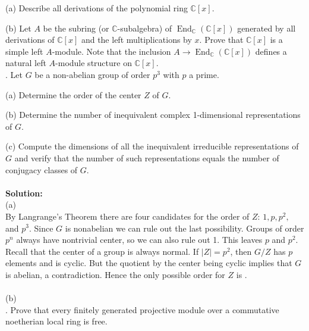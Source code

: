 \documentclass[11pt]{article}
\newcommand{\C}{\mathbb{C}}
\DeclareMathOperator{\End}{End}
\begin{document}
(a) Describe all derivations of the polynomial ring $\C[x]$.

(b) Let $A$ be the subring (or $\C$-subalgebra) of $\End_\C(\C[x])$ generated by all derivations of $\C[x]$ and the left multiplications by $x$. Prove that $\C[x]$ is a simple left $A$-module. Note that the inclusion $A\to \End_\C(\C[x])$ defines a natural left $A$-module structure on $\C[x]$. \\

. Let $G$ be a non-abelian group of order $p^3$ with $p$ a prime.

(a) Determine the order of the center $Z$ of $G$.

(b) Determine the number of inequivalent complex 1-dimensional representations of $G$. 

(c) Compute the dimensions of all the inequivalent irreducible representations of $G$ and verify that the number of such representations equals the number of conjugacy classes of $G$. \\\\
\textbf{Solution:}\\
(a)\\
By Langrange's Theorem there are four candidates for the order of $Z$: $1,p,p^2,$ and $p^3$. Since $G$ is nonabelian we can rule out the last possibility. Groups of order $p^n$ always have nontrivial center, so we can also rule out 1. This leaves $p$ and $p^2$. Recall that the center of a group is always normal. If $|Z| = p^2$, then $G/Z$ has $p$ elements and is cyclic. But the quotient by the center being cyclic implies that $G$ is abelian, a contradiction. Hence the only possible order for $Z$ is .\\\\
(b)\\


.  Prove that every finitely generated projective module over a commutative
noetherian local ring is free.
\end{document}
